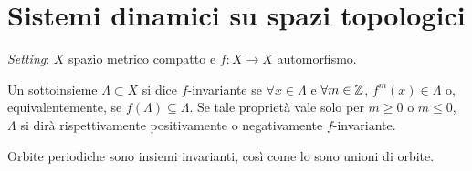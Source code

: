\section{Sistemi dinamici su spazi topologici}
\emph{Setting}: $ X $ spazio metrico compatto e $ f\colon X\to X $ automorfismo.
\begin{definition}
    Un sottoinsieme $ \Lambda \subset X $ si dice $ f $-invariante se $ \forall x\in\Lambda $ e $ \forall m \in \mathbb{Z} $, $ f^m(x) \in \Lambda $ o, equivalentemente, se $ f(\Lambda) \subseteq \Lambda $.
    Se tale proprietà vale solo per $ m \geq 0 $ o $ m \leq 0 $, $ \Lambda $ si dirà rispettivamente positivamente o negativamente $ f $-invariante.
\end{definition}

\begin{oss}
    Orbite periodiche sono insiemi invarianti, così come lo sono unioni di orbite.
\end{oss}

